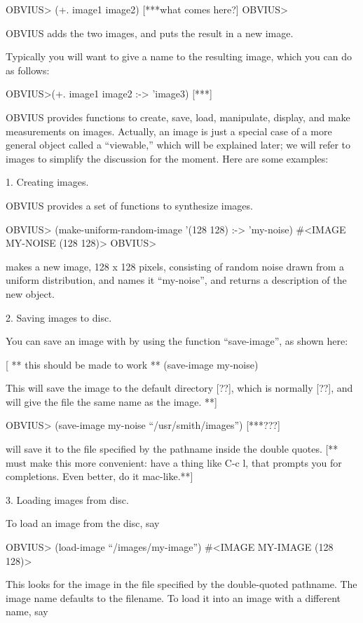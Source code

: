 OBVIUS> (+. image1 image2)
[***what comes here?]
OBVIUS>

OBVIUS adds the two images, and puts the result in a new image.

Typically you will want to give a name to the resulting image,
which you can do as follows:

OBVIUS>(+. image1 image2 :-> 'image3)
[***]

OBVIUS provides functions to create,
save, load, manipulate, display, and make measurements on images.
Actually, an image is just a special case of a more general object
called a ``viewable,'' which will be explained later; we will refer to
images to simplify the discussion for the moment.  Here are some
examples:


1. Creating images.

OBVIUS provides a set of functions to synthesize images.

OBVIUS> (make-uniform-random-image '(128 128) :-> 'my-noise)
#<IMAGE MY-NOISE (128 128)>
OBVIUS>

makes a new image, 128 x 128 pixels, consisting of random noise drawn
from a uniform distribution, and names it ``my-noise'', and returns a
description of the new object. 



2. Saving images to disc.

You can save an image with by using the function ``save-image'',
as shown here:

[ ** this should be made to work **
(save-image my-noise)

This will save the image to the default directory [??], which is normally [??],
and will give the file the same name as the image. **]

OBVIUS> (save-image my-noise ``/usr/smith/images'') [***???]

will save it to the file specified by the pathname inside the double quotes.
[** must make this more convenient: have a thing like C-c l, that
prompts you for completions.  Even better, do it mac-like.**]

3. Loading images from disc.

To load an image from the disc, say

OBVIUS> (load-image ``/images/my-image'')
#<IMAGE MY-IMAGE (128 128)>

This looks for the image in the file specified by the double-quoted
pathname.  The image name defaults to the
filename.  To load it into an image with a different name, say


